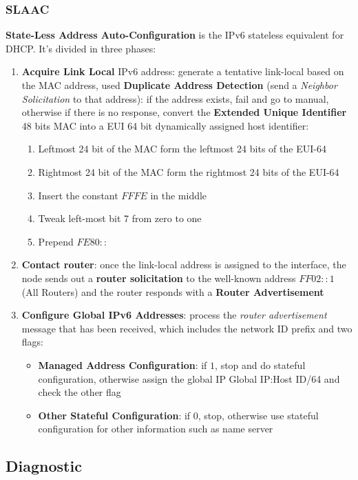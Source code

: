 \subsubsection{SLAAC}
\textbf{State-Less Address Auto-Configuration} is the IPv6 stateless equivalent for DHCP. It's divided in three phases:
\begin{enumerate}
	\item \textbf{Acquire Link Local} IPv6 address: generate a tentative link-local based on the MAC address, used \textbf{Duplicate Address Detection} (send a \textit{Neighbor Solicitation} to that address): if the address exists, fail and go to manual, otherwise if there is no response, convert the \textbf{Extended Unique Identifier} 48 bits MAC into a EUI 64 bit dynamically assigned host identifier:
	\begin{enumerate}
		\item Leftmost 24 bit of the MAC form the leftmost 24 bits of the EUI-64
		\item Rightmost 24 bit of the MAC form the rightmost 24 bits of the EUI-64
		\item Insert the constant $FFFE$ in the middle
		\item Tweak left-most bit 7 from zero to one
		\item Prepend $FE80::$
	\end{enumerate}
	\item \textbf{Contact router}: once the link-local address is assigned to the interface, the node sends out a \textbf{router solicitation} to the well-known address $FF02::1$ (All Routers) and the router responds with a \textbf{Router Advertisement}
	\item \textbf{Configure Global IPv6 Addresses}: process the \textit{router advertisement} message that has been received, which includes the network ID prefix and two flags:
	\begin{itemize}
		\item \textbf{Managed Address Configuration}: if $1$, stop and do stateful configuration, otherwise assign the global IP Global IP:Host ID/64 and check the other flag
		\item \textbf{Other Stateful Configuration}: if $0$, stop, otherwise use stateful configuration for other information such as name server
	\end{itemize}
\end{enumerate}

\subsection{Diagnostic}
